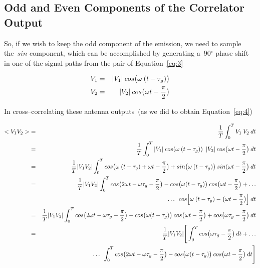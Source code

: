 \documentclass[11pt, a4paper]{article}
\newcommand{\msp}{\mkern \medmuskip}
\begin{document}
\subsection{Odd and Even Components of the Correlator Output}
So, if we wish to keep the odd component of the emission, we need to sample the~$sin$ component, which can be accomplished by generating a~90$^\circ $ phase shift in one of the signal paths from the pair of Equation~\eqref{eq:3}

\begin{eqnarray}
  \label{eq:14}
  \begin{aligned}
  V_1 &=& |V_1| \msp cos\big (\omega \msp (t - \tau _g)\big ) \\
  V_2 &=& |V_2| \msp cos\big (\omega t - \frac{\pi }{2}\big )
  \end{aligned}
\end{eqnarray}

In cross--correlating these antenna outputs~(as we did to obtain Equation~\eqref{eq:4})

\begin{eqnarray}
  \label{eq:15}
  <V_1V_2> &=& \frac{1}{T} \int _0^T V_1 \msp V_2 \msp dt \nonumber \\
           &=& \frac{1}{T}       \int _0^T |V_1| \msp cos(\omega \msp (t - \tau _g)) \enspace |V_2| \msp cos \big (\omega t - \frac{\pi }{2} \big ) \msp dt \nonumber \\
           &=& \frac{1}{T} |V_1V_2| \int _0^T cos  \big (\omega \msp (t - \tau _g) + \omega t - \frac{\pi }{2}\big) + sin \big (\omega \msp (t - \tau _g) \big) \msp sin(\omega t - \frac{\pi }{2} \big ) \msp dt \nonumber \\
           &=& \frac{1}{T} |V_1V_2| \int _0^T cos \big (2\omega t - \omega \tau _g - \frac{\pi }{2} \big ) - cos \big (\omega (t - \tau _g) \big) \msp cos \big (\omega t  -\frac{\pi }{2} \big ) + \dotso \nonumber \\
           && \dotso \enspace cos \Big [\omega \msp (t - \tau _g) - \big (\omega t - \frac{\pi }{2} \big ) \Big ] \msp dt \nonumber \\
           &=& \frac{1}{T} |V_1V_2| \int _0^T cos \big (2\omega t - \omega \tau _g - \frac{\pi }{2} \big ) - cos \big (\omega (t - \tau _g) \big) \msp cos \big (\omega t  -\frac{\pi }{2} \big ) + cos \big (\omega \tau _g - \frac{\pi }{2} \big ) \msp dt \nonumber \\
           &=& \frac{1}{T} |V_1V_2| \Bigg [\int _0^T cos \big (\omega \tau _g - \frac{\pi }{2} \big ) \msp dt + \dotso \nonumber \\
           && \dotso \enspace \int _0^T cos \big (2\omega t - \omega \tau _g - \frac{\pi }{2} \big ) - cos \big (\omega (t - \tau _g) \big) \msp cos \big (\omega t  -\frac{\pi }{2} \big ) \msp dt \Bigg ] \nonumber
\end{eqnarray}
\end{document}
